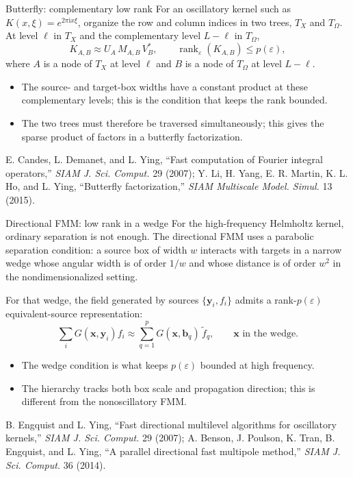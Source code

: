 \documentclass[aspectratio=169,11pt]{beamer}
\newcommand{\ii}{\mathrm i}
\newcommand{\x}{\bm{x}}
\newcommand{\y}{\bm{y}}
\newcommand{\eps}{\varepsilon}
\DeclareMathOperator{\rank}{rank}
\begin{document}
\begin{frame}{Butterfly: complementary low rank}
\small
For an oscillatory kernel such as $K(x,\xi)=e^{2\pi\ii x\xi}$, organize the
row and column indices in two trees, $T_X$ and $T_\Omega$.  At level $\ell$ in
$T_X$ and the complementary level $L-\ell$ in $T_\Omega$,
\[
  K_{A,B}\approx U_A\,M_{A,B}\,V_B^*,
  \qquad \rank_\eps(K_{A,B})\le p(\eps),
\]
where $A$ is a node of $T_X$ at level $\ell$ and $B$ is a node of
$T_\Omega$ at level $L-\ell$.

\begin{itemize}
  \item The source- and target-box widths have a constant product at these
  complementary levels; this is the condition that keeps the rank bounded.
  \item The two trees must therefore be traversed simultaneously; this gives
  the sparse product of factors in a butterfly factorization.
\end{itemize}
{\scriptsize\color{mygray}E. Candes, L. Demanet, and L. Ying, ``Fast computation of Fourier integral operators,''
\emph{SIAM J. Sci. Comput.} 29 (2007); Y. Li, H. Yang, E. R. Martin, K. L. Ho, and L. Ying,
``Butterfly factorization,'' \emph{SIAM Multiscale Model. Simul.} 13 (2015).}
\end{frame}

\begin{frame}{Directional FMM: low rank in a wedge}
\small
For the high-frequency Helmholtz kernel, ordinary separation is not enough.
The directional FMM uses a parabolic separation condition: a source box of
width $w$ interacts with targets in a narrow wedge whose angular width is of
order $1/w$ and whose distance is of order $w^2$ in the nondimensionalized
setting.

For that wedge, the field generated by sources $\{\y_i,f_i\}$ admits a
rank-$p(\eps)$ equivalent-source representation:
\[
  \sum_i G(\x,\y_i)f_i\approx
  \sum_{q=1}^{p}G(\x,\bm{b}_q)\,\widetilde f_q,
  \qquad \x\text{ in the wedge}.
\]

\begin{itemize}
  \item The wedge condition is what keeps $p(\eps)$ bounded at high frequency.
  \item The hierarchy tracks both box scale and propagation direction; this is
  different from the nonoscillatory FMM.
\end{itemize}
{\scriptsize\color{mygray}B. Engquist and L. Ying, ``Fast directional multilevel algorithms for oscillatory kernels,''
\emph{SIAM J. Sci. Comput.} 29 (2007); A. Benson, J. Poulson, K. Tran, B. Engquist, and L. Ying,
``A parallel directional fast multipole method,'' \emph{SIAM J. Sci. Comput.} 36 (2014).}
\end{frame}
\end{document}
